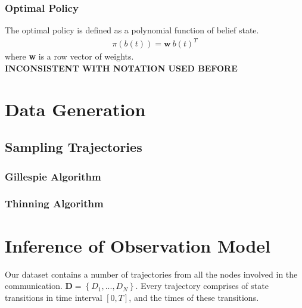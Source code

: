 \subsubsection{Optimal Policy}

The optimal policy is defined as a polynomial function of belief state.
\begin{align}
\pi(b(t)) = \textbf{w}\ b(t)^T
\end{align}
where \textbf{w} is a row vector of weights.\\
\textbf{INCONSISTENT WITH NOTATION USED BEFORE}

\section{Data Generation}
\subsection{Sampling Trajectories}
\subsubsection{Gillespie Algorithm}
\subsubsection{Thinning Algorithm}
\section{Inference of Observation Model}
Our dataset contains a number of trajectories from all the nodes involved in the communication. $ \textbf{D} = \left\lbrace D_{1},..., D_{N}\right\rbrace $. Every trajectory comprises of state transitions in time interval $  [0, T] $, and the times of these transitions.


